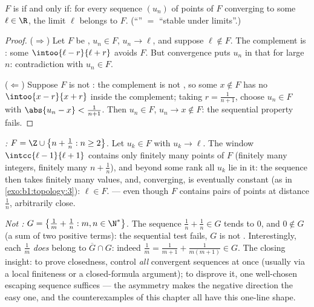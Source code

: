\begin{theorem}\label{thm:b1:topology:seqclosed}
$F$ is  if and only if: for every sequence $(u_n)$ of points of
$F$ converging to some $\ell \in \R$, the limit $\ell$ belongs to
$F$. (``'' $=$ ``stable under limits''.)
\end{theorem}

\begin{proof}
($\Rightarrow$) Let $F$ be , $u_n \in F$, $u_n \to \ell$, and
suppose $\ell \notin F$. The complement is : some
$\intoo{\ell - r}{\ell + r}$ avoids $F$. But convergence puts $u_n$
in that  for large $n$: contradiction with $u_n \in F$.

($\Leftarrow$) Suppose $F$ is not : the complement is not ,
so some $x \notin F$ has no  $\intoo{x - r}{x + r}$ inside
the complement; taking $r = \frac{1}{n+1}$, choose $u_n \in F$ with
$\abs{u_n - x} < \frac{1}{n+1}$. Then $u_n \in F$, $u_n \to x \notin
F$: the sequential property fails.
\end{proof}

\begin{example}\label{ex:b1:topology:seqtest}
\emph{:} $F = \Z \cup \bigl\{n + \frac1n : n \geq 2\bigr\}$.
Let $u_k \in F$ with $u_k \to \ell$. The window $\intcc{\ell -
1}{\ell + 1}$ contains only finitely many points of $F$ (finitely
many integers, finitely many $n + \frac1n$), and beyond some rank
all $u_k$ lie in it: the sequence then takes finitely many
values, and, converging, is eventually constant (as in
\cref{exo:b1:topology:3}): $\ell \in F$.  --- even though
$F$ contains pairs of points at distance $\frac1n$, arbitrarily
close.

\emph{Not :} $G = \bigl\{\frac1m + \frac1n : m, n \in
\N^*\bigr\}$. The sequence $\frac1n + \frac1n \in G$ tends to
$0$, and $0 \notin G$ (a sum of two positive terms): the
sequential test fails, $G$ is not . Interestingly, each
$\frac1m$ \emph{does} belong to $\overline G \cap G$: indeed
$\frac1m = \frac{1}{m+1} + \frac{1}{m(m+1)} \in G$. The closing
insight: to prove closedness, control \emph{all} convergent
sequences at once (usually via a local finiteness or a
closed-formula argument); to disprove it, one well-chosen escaping
sequence suffices --- the asymmetry makes the negative direction
the easy one, and the counterexamples of this chapter all have
this one-line shape.
\end{example}

